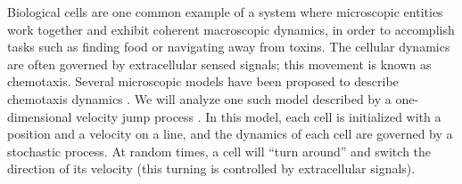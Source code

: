 \documentclass[prl, reprint]{revtex4-1}
\begin{document}
%



Biological cells are one common example of a system where microscopic entities work together and exhibit coherent macroscopic dynamics, in order to accomplish tasks such as finding food or navigating away from toxins.
%
The cellular dynamics are often governed by extracellular sensed signals; this movement is known as chemotaxis. 
%
Several microscopic models have been proposed to describe chemotaxis dynamics \cite{othmer1988models, codling2008random}.
%
We will analyze one such model described by a one-dimensional velocity jump process \cite{othmer2000diffusion}.
%
In this model, each cell is initialized with a position and a velocity on a line, and the dynamics of each cell are governed by a stochastic process.
%
At random times, a cell will ``turn around'' and switch the direction of its velocity (this turning is controlled by extracellular signals). 
%

\end{document}

